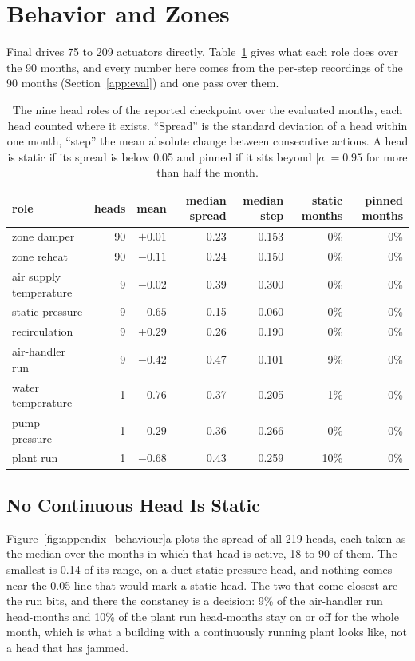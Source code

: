 \documentclass{article}
\begin{document}
\section{Behavior and Zones}
\label{app:behaviour}

Final drives 75 to 209 actuators directly. Table~\ref{tab:app_heads} gives what each role does over the 90 months, and every number here comes from the per-step recordings of the 90 months (Section~\ref{app:eval}) and one pass over them.

\begin{table}[h!]
\centering
\small
\setlength{\tabcolsep}{4pt}
\begin{tabular}{@{}lrrrrrr@{}}
\toprule
role & heads & mean & median spread & median step & static months & pinned months \\
\midrule
zone damper & 90 & $+0.01$ & 0.23 & 0.153 & 0\% & 0\% \\
zone reheat & 90 & $-0.11$ & 0.24 & 0.150 & 0\% & 0\% \\
air supply temperature & 9 & $-0.02$ & 0.39 & 0.300 & 0\% & 0\% \\
static pressure & 9 & $-0.65$ & 0.15 & 0.060 & 0\% & 0\% \\
recirculation & 9 & $+0.29$ & 0.26 & 0.190 & 0\% & 0\% \\
air-handler run & 9 & $-0.42$ & 0.47 & 0.101 & 9\% & 0\% \\
water temperature & 1 & $-0.76$ & 0.37 & 0.205 & 1\% & 0\% \\
pump pressure & 1 & $-0.29$ & 0.36 & 0.266 & 0\% & 0\% \\
plant run & 1 & $-0.68$ & 0.43 & 0.259 & 10\% & 0\% \\
\bottomrule
\end{tabular}
\vspace{4pt}
\caption{The nine head roles of the reported checkpoint over the evaluated months, each head counted where it exists. ``Spread'' is the standard deviation of a head within one month, ``step'' the mean absolute change between consecutive actions. A head is static if its spread is below 0.05 and pinned if it sits beyond $|a|=0.95$ for more than half the month.}
\label{tab:app_heads}
\end{table}

\subsection{No Continuous Head Is Static}

Figure~\ref{fig:appendix_behaviour}a plots the spread of all 219 heads, each taken as the median over the months in which that head is active, 18 to 90 of them. The smallest is 0.14 of its range, on a duct static-pressure head, and nothing comes near the 0.05 line that would mark a static head. The two that come closest are the run bits, and there the constancy is a decision: 9\% of the air-handler run head-months and 10\% of the plant run head-months stay on or off for the whole month, which is what a building with a continuously running plant looks like, not a head that has jammed.
\end{document}
